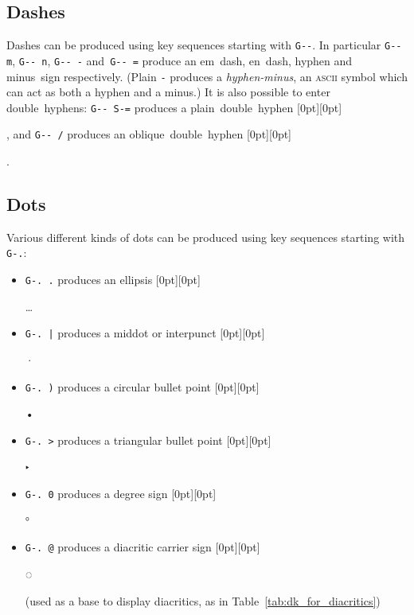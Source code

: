 \documentclass[oneside]{memoir}
\newcommand{\key}{\verb}
\newcommand{\out}[1]{\raisebox{0pt}[0pt][0pt]{\setlength{\fboxsep}{1pt}\colorbox{gray!20}{\strut{}#1}}}
\begin{document}
{{{\subsection{Dashes}
\label{sec:dashes}

Dashes can be produced using key sequences starting with \key|G--|.
In particular \key|G-- m|, \key|G-- n|, \key|G-- -| and~\key|G-- =|
  produce an em~dash, en~dash, hyphen and minus~sign respectively.
(Plain \key|-| produces a \textit{hyphen-minus},
  an \textsc{ascii} symbol which can act as both a hyphen and a minus.)
It is also possible to enter double~hyphens:
  \key|G-- S-=| produces a plain~double~hyphen \out{}, and \key|G-- /| produces an oblique~double~hyphen \out{}.

\subsection{Dots}
\label{sec:dots}

Various different kinds of dots can be produced using key sequences starting with \key|G-.|:

\begin{itemize}[noitemsep]
\item \key|G-. .| produces an ellipsis \out{…}
\item \key!G-. |! produces a middot or interpunct \out{·}
\item \key|G-. )| produces a circular bullet point \out{•}
\item \key|G-. >| produces a triangular bullet point \out{‣}
\item \key|G-. 0| produces a degree sign \out{°}
\item \key|G-. @| produces a diacritic carrier sign \out{◌}
  (used as a base to display diacritics, as in Table~\ref{tab:dk_for_diacritics})
\end{itemize}

}}}
\end{document}
